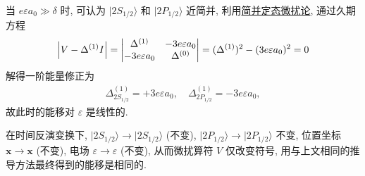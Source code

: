 \documentclass{assignment}
\begin{document}
\begin{sol}
    当 $e\varepsilon a_0\gg\delta$ 时, 可认为 $\lvert 2S_{1/2}\rangle$ 和 $\lvert 2P_{1/2}\rangle$ 近简并, 利用\uline{简并定态微扰论}, 通过久期方程
    \begin{align}
        \left\lvert V-\Delta^{(1)}I\right\rvert=\begin{vmatrix}
            \Delta^{(1)}&-3e\varepsilon a_0\\
            -3e\varepsilon a_0&\Delta^{(0)}
        \end{vmatrix}=(\Delta^{(1)})^2-(3e\varepsilon a_0)^2=0
    \end{align}
    解得一阶能量修正为
    \begin{align}
        \Delta_{2S_{1/2}}^{(1)}=+3e\varepsilon a_0,\quad\Delta_{2P_{1/2}}^{(1)}=-3e\varepsilon a_0,
    \end{align}
    故此时的能移对 $\varepsilon$ 是线性的.

    在时间反演变换下, $\lvert 2S_{1/2}\rangle\rightarrow\lvert 2S_{1/2}\rangle$ (不变), $\lvert 2P_{1/2}\rangle\rightarrow\lvert 2P_{1/2}\rangle$ 不变, 位置坐标 $\bm{x}\rightarrow\bm{x}$ (不变), 电场 $\varepsilon\rightarrow\varepsilon$ (不变), 从而微扰算符 $V$ 仅改变符号, 用与上文相同的推导方法最终得到的能移是相同的.
\end{sol}
\end{document}
